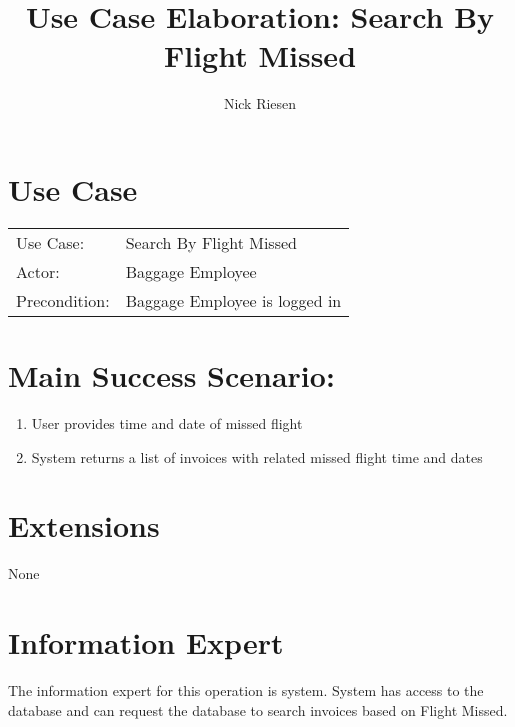 \documentclass{article}
\title{Use Case Elaboration: Search By Flight Missed}
\author{ Nick Riesen }
\begin{document}
\maketitle


\section*{Use Case}
\begin{tabular}{l l}
Use Case:     & Search By Flight Missed       \\
Actor:        & Baggage Employee              \\
Precondition: & Baggage Employee is logged in \\
\end{tabular}


\section*{Main Success Scenario:}

\begin{enumerate}
    \item  User provides time and date of missed flight
    \item System returns a list of invoices with related missed flight time and dates

\end{enumerate}

\section*{Extensions}
None

\section*{Information Expert}

The information expert for this operation is system. System has access to the database and can request the database to search invoices based on Flight Missed.
\end{document}
